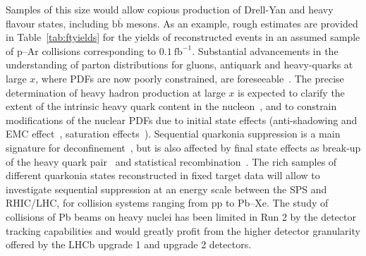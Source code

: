 \documentclass[../report.tex]{subfiles}
\begin{document}
Samples of this size would allow copious production of Drell-Yan
and heavy flavour states, including $\textrm{b}\overline{\textrm{b}}$ mesons.
As an example, rough estimates are provided in
Table~\ref{tab:ftyields} for the yields of reconstructed events in an assumed sample of p--Ar collisions corresponding to $0.1~\textrm{fb}^{-1}$.
Substantial advancements in the understanding of parton
distributions for gluons, antiquark and heavy-quarks 
at large $x$, where PDFs are now poorly constrained, are
foreseeable~\cite{after,Hadjidakis:2018ifr}. The precise determination
of heavy hadron production at large $x$ is expected to clarify
the  extent of the intrinsic heavy quark content
in the nucleon~\cite{Brodsky:1980pb,Brodsky:2015fna}, and to constrain
modifications of the nuclear PDFs due to initial state effects
(anti-shadowing and EMC effect~\cite{Geesaman:1995yd}, saturation
effects~\cite{Albacete:2014fwa}).
Sequential quarkonia suppression is a main signature for
deconfinement~\cite{Matsui:1986dk}, but is also affected by final
state effects as break-up of the heavy quark  pair~\cite{Vogt:2001ky}
and statistical recombination~\cite{BraunMunzinger:2000px}.
The rich samples of  different quarkonia states reconstructed 
in fixed target data will allow to
investigate sequential suppression at an energy scale
between the SPS and RHIC/LHC, for 
collision systems ranging from pp to Pb--Xe.
The study of collisions of Pb beams on heavy nuclei has been 
limited in Run 2  by the detector tracking capabilities and would
greatly profit from the higher detector granularity offered by the 
LHCb upgrade 1 and upgrade 2 detectors.
\end{document}
